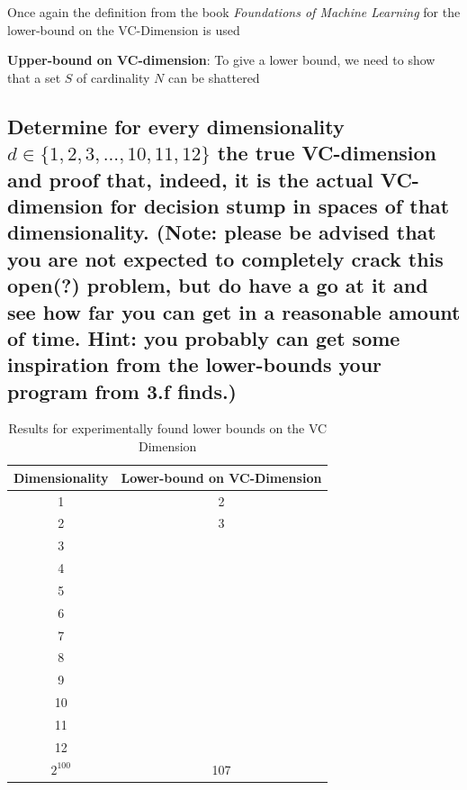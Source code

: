 \documentclass[11pt,a4paper]{article}
\begin{document}
Once again the definition from the book \textit{Foundations of Machine Learning} \cite{foundations_of_machine_learning} for the lower-bound on the VC-Dimension is used

\textbf{Upper-bound on VC-dimension}: To give a lower bound, we need to show that a set $S$ of cardinality $N$ can be shattered

\subsection{Determine for every dimensionality $d ∈ \{1, 2, 3, . . . , 10, 11, 12\}$ the true VC-dimension and proof that, indeed, it is the actual VC-dimension for decision stump in spaces of that dimensionality. (Note: please be advised that you are not expected to completely crack this open(?) problem, but do have a go at it and see how far you can get in a reasonable amount of time. Hint: you probably can get some inspiration from the lower-bounds your program from 3.f finds.)}
\label{sec:2e}

\begin{table}
    \begin{tabular}{|c|c|}
    \hline
    Dimensionality & Lower-bound on VC-Dimension \\ \hline
    1              & 2                            \\ \hline
    2              & 3                            \\ \hline
    3              &                             \\ \hline
    4              &                             \\ \hline
    5              &                             \\ \hline
    6              &                             \\ \hline
    7              &                            \\ \hline
    8              &                             \\ \hline
    9              &                             \\ \hline
    10              &                             \\ \hline
    11             &                            \\ \hline
    12              &                             \\ \hline

    
    $2^{100}$        & 107 \\
    \hline
    \end{tabular}
    \caption{Results for experimentally found lower bounds on the VC Dimension}
    \label{tab:upper-bound-vc}
\end{table}




\end{document}
